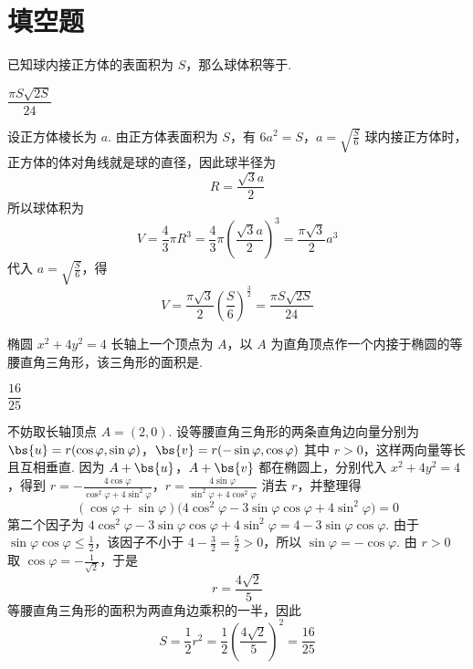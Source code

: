 \section{填空题}
\begin{problem}
已知球内接正方体的表面积为 \(S\)，那么球体积等于\fillinblank{}.
\end{problem}

\begin{answer}
\(\dfrac{\pi S\sqrt{2S}}{24}\)
\end{answer}

\begin{solution}
设正方体棱长为 \(a\). 由正方体表面积为 \(S\)，有
\(6a^2=S\)，\(a=\sqrt{\frac{S}{6}}\)
球内接正方体时，正方体的体对角线就是球的直径，因此球半径为
\[
R=\frac{\sqrt3 a}{2}
\]
所以球体积为
\[
V=\frac43\pi R^3
=\frac43\pi\left(\frac{\sqrt3 a}{2}\right)^3
=\frac{\pi\sqrt3}{2}a^3
\]
代入 \(a=\sqrt{\frac{S}{6}}\)，得
\[
V=\frac{\pi\sqrt3}{2}\left(\frac{S}{6}\right)^{\frac{3}{2}}
=\frac{\pi S\sqrt{2S}}{24}
\]
\end{solution}

\begin{problem}
椭圆 \(x^{2} + 4y^{2} = 4\) 长轴上一个顶点为 \(A\)，以 \(A\) 为直角顶点作一个内接于椭圆的等腰直角三角形，该三角形的面积是\fillinblank{}.
\end{problem}

\begin{answer}
\(\dfrac{16}{25}\)
\end{answer}

\begin{solution}
不妨取长轴顶点 \(A=(2,0)\). 设等腰直角三角形的两条直角边向量分别为
\(\bs{u}=r(\cos\varphi,\sin\varphi)\)，\(\bs{v}=r(-\sin\varphi,\cos\varphi)\)
其中 \(r>0\)，这样两向量等长且互相垂直. 因为 \(A+\bs{u}\)，\(A+\bs{v}\) 都在椭圆上，分别代入 \(x^2+4y^2=4\)，得到
\(r=-\frac{4\cos\varphi}{\cos^2\varphi+4\sin^2\varphi}\)，\(r=\frac{4\sin\varphi}{\sin^2\varphi+4\cos^2\varphi}\)
消去 \(r\)，并整理得
\[
(\cos\varphi+\sin\varphi)\bigl(4\cos^2\varphi-3\sin\varphi\cos\varphi+4\sin^2\varphi\bigr)=0
\]
第二个因子为
\(4\cos^2\varphi-3\sin\varphi\cos\varphi+4\sin^2\varphi
=4-3\sin\varphi\cos\varphi\). 由于
\(\sin\varphi\cos\varphi\leqslant\frac12\)，该因子不小于
\(4-\frac32=\frac52>0\)，所以 \(\sin\varphi=-\cos\varphi\). 由 \(r>0\) 取 \(\cos\varphi=-\frac1{\sqrt2}\)，于是
\[
r=\frac{4\sqrt2}{5}
\]
等腰直角三角形的面积为两直角边乘积的一半，因此
\[
S=\frac12r^2=\frac12\left(\frac{4\sqrt2}{5}\right)^2=\frac{16}{25}
\]
\end{solution}

